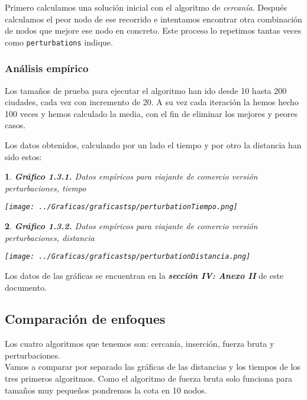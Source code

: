 \documentclass[10pt, a4paper]{article}
\theoremstyle{theorem-style}
\newtheorem*{datos}{}
\theoremstyle{theorem-style}
\theoremstyle{definition-style}
\theoremstyle{remark-style}
\theoremstyle{example-style}
\theoremstyle{definition-style}
\theoremstyle{remark-style}
\begin{document}
Primero calculamos una solución inicial con el algoritmo de \emph{cercanía}. Después calculamos el peor nodo de ese recorrido e intentamos encontrar otra combinación de nodos que mejore ese nodo en concreto. Este proceso lo repetimos tantas veces como \texttt{perturbations} indique. 

\subsubsection*{Análisis empírico}

Los tamaños de prueba para ejecutar el algoritmo han ido desde 10 hasta 200 ciudades, cada vez con incremento de 20. A su vez cada iteración la hemos hecho 100 veces y hemos calculado la media, con el fin de eliminar los mejores y peores casos.  

Los datos obtenidos, calculando por un lado el tiempo y por otro la distancia han sido estos:

\begin{datos}
	{\bf\sffamily Gráfico 1.3.1.} {\sffamily  Datos empíricos para viajante de comercio versión perturbaciones, tiempo}\\
	\vspace{-0.7cm}
	\begin{center}
		\texttt{[image: ../Graficas/graficastsp/perturbationTiempo.png]}
	\end{center}	
\end{datos}

\pagebreak

\begin{datos}
	{\bf\sffamily Gráfico 1.3.2.} {\sffamily Datos empíricos para viajante de comercio versión perturbaciones, distancia}\\
	\vspace{-0.7cm}
	\begin{center}
		\texttt{[image: ../Graficas/graficastsp/perturbationDistancia.png]}
	\end{center}	
\end{datos}

Los datos de las gráficas se encuentran en la \textbf{\emph{sección IV: Anexo II}} de este documento.

\pagebreak

\subsection{Comparación de enfoques}

Los cuatro algoritmos que tenemos son: cercanía, inserción, fuerza bruta y perturbaciones. \\
Vamos a comparar por separado las gráficas de las distancias y los tiempos de los tres primeros algoritmos. Como el algoritmo de fuerza bruta solo funciona para tamaños muy pequeños pondremos la cota en 10 nodos.
\end{document}
